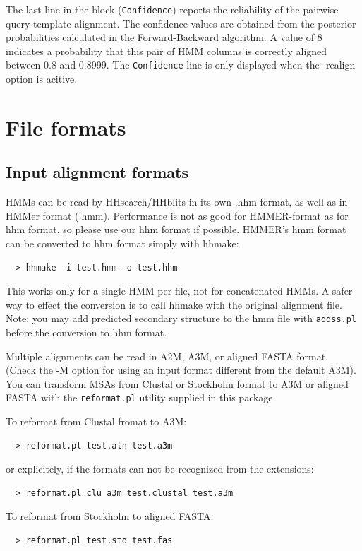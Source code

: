 \documentclass[11pt,a4paper]{article}
\begin{document}
The last line in the block ({\tt Confidence}) reports the reliability of the pairwise 
query-template alignment. The confidence values are obtained from the posterior 
probabilities calculated in the Forward-Backward algorithm. A value of 8 indicates
a probability that this pair of HMM columns is correctly aligned between 0.8 and 0.8999. 
The {\tt Confidence} line is only displayed when the -realign option is acitive.


\section{File formats}

\subsection{Input alignment formats} \label{aliformats}

HMMs can be read by HHsearch/HHblits in its own .hhm format, as well as in HMMer format (.hmm).
Performance is not as good for HMMER-format as for hhm format, so please use 
our hhm format if possible. HMMER's hmm format can be converted to hhm format simply 
with hhmake:
\begin{verbatim}
  > hhmake -i test.hmm -o test.hhm
\end{verbatim}

This works only for a single HMM per file, not for concatenated HMMs. A safer way to 
effect the conversion is to call hhmake with the original alignment file. Note: you 
may add predicted secondary structure to the hmm file with \verb`addss.pl` before the 
conversion to hhm format.

Multiple alignments can be read in A2M, A3M, or aligned FASTA format. (Check the -M option for 
using an input format different from the default A3M). You can transform MSAs 
from Clustal or Stockholm format to A3M or aligned FASTA with the \verb`reformat.pl` utility 
supplied in this package. 

To reformat from Clustal fromat to A3M:
\begin{verbatim}
  > reformat.pl test.aln test.a3m
\end{verbatim}
or explicitely, if the formats can not be recognized from the extensions:
\begin{verbatim}
  > reformat.pl clu a3m test.clustal test.a3m
\end{verbatim}
To reformat from Stockholm to aligned FASTA:
\begin{verbatim}
  > reformat.pl test.sto test.fas
\end{verbatim}
\end{document}
